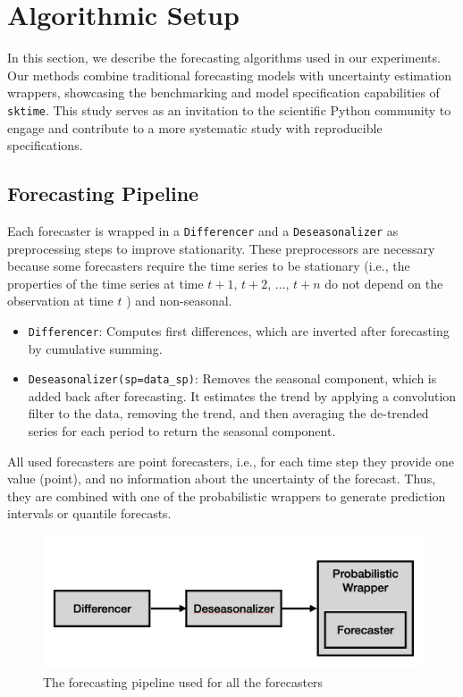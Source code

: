 \section{Algorithmic Setup} \label{methods}

In this section, we describe the forecasting algorithms used in our experiments. Our methods combine traditional forecasting models with uncertainty estimation wrappers, showcasing the benchmarking and model specification capabilities of \texttt{sktime}. This study serves as an invitation to the scientific Python community to engage and contribute to a more systematic study with reproducible specifications.

\subsection{Forecasting Pipeline}
Each forecaster is wrapped in a \texttt{Differencer} and a \texttt{Deseasonalizer} as preprocessing steps to improve stationarity. These preprocessors are necessary because some forecasters require the time series to be stationary (i.e., the properties of the time series at time $t+1$, $t+2$, ..., $t+n$ do not depend on the observation at time $t$ \cite{hyndman2018}) and non-seasonal.

\begin{itemize}
    \item \texttt{Differencer}: Computes first differences, which are inverted after forecasting by cumulative summing.
    \item \texttt{Deseasonalizer(sp=data\_sp)}: Removes the seasonal component, which is added back after forecasting. It estimates the trend by applying a convolution filter to the data, removing the trend, and then averaging the de-trended series for each period to return the seasonal component.
\end{itemize}

All used forecasters are point forecasters, i.e., for each time step they provide one value (point), and no information about the uncertainty of the forecast. Thus, they are combined with one of the probabilistic wrappers to generate prediction intervals or quantile forecasts.

\begin{figure}
    \centering
    \includegraphics[width=\textwidth]{Figures/Pipeline.png}
    \caption{The forecasting pipeline used for all the forecasters}
    \label{fig:pipeline}
\end{figure}

